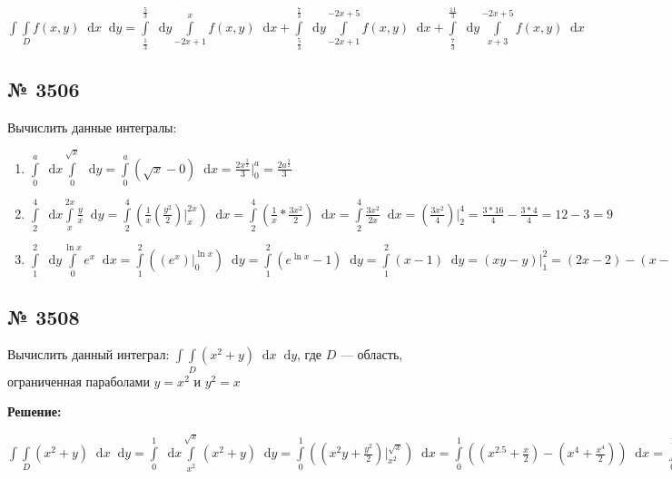 \documentclass{article}
\newcommand*\diff{\mathop{}\!\mathrm{d}}
\begin{document}
$\int\int\limits_{D} f(x, y) \diff x \diff y = \int\limits_{\frac{1}{3}}^{\frac{5}{3}} \diff y \int\limits_{-2x+1}^{x} f(x, y) \diff x + \int\limits_{\frac{5}{3}}^{\frac{7}{3}} \diff y \int\limits_{-2x+1}^{-2x+5} f(x, y) \diff x + \int\limits_{\frac{7}{3}}^{\frac{11}{3}} \diff y \int\limits_{x+3}^{-2x+5} f(x, y) \diff x$

\subsection{№ 3506}

Вычислить данные интегралы:

\begin{enumerate}
    \item $\int \limits_{0}^{a} \diff x \int\limits_{0}^{\sqrt{x}} \diff y = \int\limits_{0}^{a} (\sqrt{x} - 0) \diff x = \frac{2x^{\frac{3}{2}}}{3} \bigg|_{0}^{a} = \frac{2a^{\frac{3}{2}}}{3}$
    \item $\int\limits_{2}^{4} \diff x \int\limits_{x}^{2x} \frac{y}{x} \diff y = \int\limits_{2}^{4} (\frac{1}{x} (\frac{y^2}{2})\bigg|_{x}^{2x}) \diff x = \int\limits_{2}^{4} (\frac{1}{x} * \frac{3x^2}{2}) \diff x = \int\limits_{2}^{4} \frac{3x^2}{2x} \diff x = (\frac{3x^2}{4}) \bigg|_{2}^{4} = \frac{3*16}{4} - \frac{3 * 4}{4} = 12 - 3 = 9$
    \item $\int\limits_{1}^{2} \diff y \int\limits_{0}^{\ln x} e^{x} \diff x = \int\limits_{1}^{2} ((e^{x}) \bigg|_{0}^{\ln x}) \diff y = \int\limits_{1}^{2} (e^{\ln x} - 1) \diff y = \int\limits_{1}^{2} (x - 1) \diff y = (xy - y) \bigg|_{1}^{2} = (2x - 2) - (x - 1) = x - 1$
\end{enumerate}

\subsection{№ 3508}

Вычислить данный интеграл: $\int\int\limits_{D} (x^2 + y) \diff x \diff y$, где $D$ — область, ограниченная параболами $y = x^2$ и $y^2 = x$

\textbf{Решение:}

$\int\int\limits_{D} (x^2 + y) \diff x \diff y = \int\limits_{0}^{1} \diff x \int\limits_{x^2}^{\sqrt{x}} (x^2 + y) \diff y = \int\limits_{0}^{1} ((x^2 y + \frac{y^2}{2}) \bigg|_{x^2}^{\sqrt{x}}) \diff x = \int\limits_{0}^{1} ((x^{2.5} + \frac{x}{2}) - (x^4 + \frac{x^4}{2})) \diff x = \int\limits_{0}^{1} (x^{2.5} + \frac{1}{2} x - \frac{1}{2} x^4) \diff x = \int\limits_{0}^{1} (x^{5/2}) \diff x + \frac{1}{2} \int\limits_{0}^{1} (x) - \frac{1}{2} \int\limits_{0}^{1} (x^4) \diff x = 0.435714$
\end{document}
